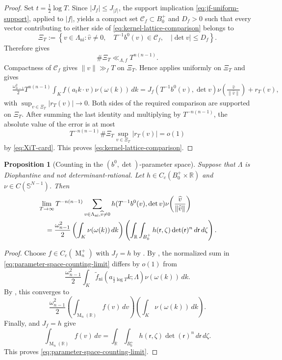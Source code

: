 \documentclass[reqno,11pt]{amsart}
\numberwithin{equation}{section}
\newtheorem{proposition}[theorem]{Proposition}
\theoremstyle{definition}
\theoremstyle{remark}
\newcommand{\op}{\operatorname}
\newcommand{\R}{\mathbb R}
\newcommand{\M}{\op{M}}
\renewcommand{\r}{\mathsf r}
\begin{document}
\begin{proof}
Set $t=\frac12\log T$. Since $|J_f|\le J_{|f|}$, the support
implication \eqref{eq:jf-uniform-support}, applied to $|f|$, yields a compact set
$\mathscr C_f\subset B_0^+$ and $D_f>0$ such that every vector
contributing to either side of
\eqref{eq:kernel-lattice-comparison} belongs to
$$
\Xi_T
:=
\left\{v\in\Lambda_{\operatorname{ni}}:
\widehat v\ne0,\quad
T^{-1}b^0(v)\in\mathscr C_f,\quad
|\det v|\le D_f
\right\}.
$$
Therefore  gives
\begin{equation}\label{eq:XiT-card}
\#\Xi_T\ll_{\Lambda,f} T^{n(n-1)}.
\end{equation}
Compactness of $\mathscr C_f$ gives $\|v\|\gg_f T$ on $\Xi_T$.
Hence 
applies uniformly on $\Xi_T$ and gives
\begin{align*}
&\frac{\omega_{n-1}^2}{2}T^{n(n-1)}
\int_K f(a_tk\cdot v)\nu(\omega(k))\,dk=
J_f(T^{-1}b^0(v),\det v)
\nu\!\left(\frac{\widehat v}{\|\widehat v\|}\right)+r_T(v),
\end{align*}
with $\sup_{v\in\Xi_T}|r_T(v)|\to0$. Both sides of the required comparison are supported on $\Xi_T$.
After summing the last identity and multiplying by $T^{-n(n-1)}$, the
absolute value of the error is at most
$$
T^{-n(n-1)}\#\Xi_T\sup_{v\in\Xi_T}|r_T(v)|=o(1)
$$
by \eqref{eq:XiT-card}. This proves
\eqref{eq:kernel-lattice-comparison}.
\end{proof}

\begin{proposition}[Counting in the $(b^0,\det)$-parameter space]
\label{prop:countinglimit-quotient}
Suppose that $\Lambda$ is Diophantine and not determinant-rational.  Let
$h\in C_c(B_0^+\times\R)$ and
$\nu\in C(\mathbb S^{N-1})$.  Then
\begin{align}\label{eq:parameter-space-counting-limit}
&\lim_{T\to\infty}
T^{-n(n-1)}
\sum_{\substack{v\in\Lambda_{\operatorname{ni}}, \widehat v\ne0}}
h(T^{-1}b^0(v),\det v)
\nu\!\left(\frac{\widehat v}{\|\widehat v\|}\right)\notag\\
&\quad=
\frac{\omega_{n-1}^2}{2}
\left(\int_K\nu(\omega(k))\,dk\right)
\left(
\int_{\R}\int_{B_0^+}
h(\r,\zeta)\det(\r)^n\,d\r\,d\zeta
\right).
\end{align}
\end{proposition}
\begin{proof}
Choose $f\in C_c(\M_n^+)$ with $J_f=h$ by
. By , the normalized sum in
\eqref{eq:parameter-space-counting-limit} differs by $o(1)$ from
$$
\frac{\omega_{n-1}^2}{2}
\int_K
\widetilde f_{\operatorname{ni}}
\left(a_{\frac12\log T}k;\Lambda\right)
\nu(\omega(k))\,dk.
$$
By , this converges to
$$
\frac{\omega_{n-1}^2}{2}
\left(\int_{\M_n(\mathbb R)}f(v)\,dv\right)
\left(\int_K\nu(\omega(k))\,dk\right).
$$
Finally,  and $J_f=h$ give
$$
\int_{\M_n(\mathbb R)}f(v)\,dv
=
\int_{\mathbb R}\int_{B_0^+}
h(\mathsf r,\zeta)\det(\mathsf r)^n\,d\mathsf r\,d\zeta.
$$
This proves \eqref{eq:parameter-space-counting-limit}.
\end{proof}
\end{document}
